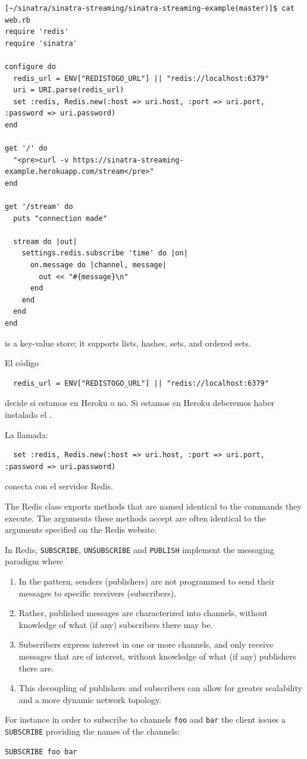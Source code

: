\begin{verbatim}
[~/sinatra/sinatra-streaming/sinatra-streaming-example(master)]$ cat web.rb
require 'redis'
require 'sinatra'

configure do
  redis_url = ENV["REDISTOGO_URL"] || "redis://localhost:6379"
  uri = URI.parse(redis_url)
  set :redis, Redis.new(:host => uri.host, :port => uri.port, :password => uri.password)
end

get '/' do
  "<pre>curl -v https://sinatra-streaming-example.herokuapp.com/stream</pre>"
end

get '/stream' do
  puts "connection made"

  stream do |out|
    settings.redis.subscribe 'time' do |on|
      on.message do |channel, message|
        out << "#{message}\n"
      end
    end
  end
end
\end{verbatim}
\Redis{} is a key-value store; it supports lists, hashes, sets, and ordered sets.

El código 
\begin{verbatim}
  redis_url = ENV["REDISTOGO_URL"] || "redis://localhost:6379"
\end{verbatim}
decide si estamos en Heroku o no. Si estamos en Heroku deberemos haber instalado
el .


La llamada:
\begin{verbatim}
  set :redis, Redis.new(:host => uri.host, :port => uri.port, :password => uri.password)
\end{verbatim}
conecta con el servidor Redis.

The Redis class exports methods that are named identical to the
commands they execute. The arguments these methods accept are often
identical to the arguments specified on the Redis website.

In Redis,
\verb|SUBSCRIBE|, \verb|UNSUBSCRIBE| and \verb|PUBLISH| implement 
the  messaging paradigm where 
\begin{enumerate}
\item 
In the  pattern, senders (publishers) are not programmed to send their messages to
specific receivers (subscribers). 
\item 
Rather, published messages are
characterized into channels, without knowledge of what (if any)
subscribers there may be. 
\item 
Subscribers express interest in one or
more channels, and only receive messages that are of interest,
without knowledge of what (if any) publishers there are. 
\item 
This
decoupling of publishers and subscribers can allow for greater
scalability and a more dynamic network topology.
\end{enumerate}
For instance in order to subscribe to channels \verb|foo| and \verb|bar| the
client issues a \verb|SUBSCRIBE| providing the names of the channels:
\begin{verbatim}
SUBSCRIBE foo bar
\end{verbatim}

